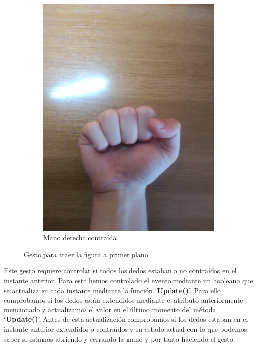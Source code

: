 \documentclass[a4paper,11pt]{article}
\begin{document}
\begin{figure}[!h]
\begin{subfigure}{0.48\textwidth}
		\includegraphics[scale=0.066]{./Imagenes/trae_da_vinci2.jpg}
		\caption{Mano derecha contraída}
	\end{subfigure}
	\caption{Gesto para traer la figura a primer plano}
	\label{gesto1}
\end{figure}

Este gesto requiere controlar si todos los dedos estaban o no contraídos en el instante anterior. Para esto hemos controlado el evento mediante un booleano que se actualiza en cada instante mediante la función `\textbf{Update()}'. Para ello comprobamos si los dedos están extendidos mediante el atributo anteriormente mencionado y actualizamos el valor en el último momento del método `\textbf{Update()}'. Antes de esta actualización comprobamos si los dedos estaban en el instante anterior extendidos o contraídos y su estado actual con lo que podemos saber si estamos abriendo y cerrando la mano y por tanto haciendo el gesto.

\vspace{10px}
\end{document}
